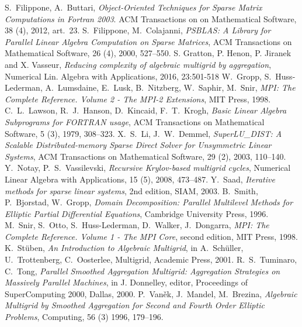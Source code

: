 \begin{thebibliography}{99}
%
S.~Filippone, A.~Buttari,
{\em Object-Oriented Techniques for Sparse Matrix Computations in Fortran 2003}.
ACM Transactions on on Mathematical Software, 38 (4), 2012, art.~23.
%
S.~Filippone, M.~Colajanni,
{\em PSBLAS: A Library for Parallel Linear Algebra
Computation on Sparse Matrices},
ACM Transactions on Mathematical Software, 26 (4), 2000, 527--550.
%
S. Gratton, P. Henon, P. Jiranek and X. Vasseur,
  {\em Reducing complexity of algebraic multigrid by aggregation},
Numerical Lin. Algebra with Applications, 2016, 23:501-518
%
W.~Gropp, S.~Huss-Lederman, A.~Lumsdaine, E.~Lusk, B.~Nitzberg, W.~Saphir, M.~Snir,
{\em MPI: The Complete Reference. Volume 2 - The MPI-2 Extensions},
MIT Press, 1998.
%
C.~L.~Lawson, R.~J.~Hanson, D.~Kincaid, F.~T.~Krogh,
\emph{Basic Linear Algebra Subprograms for FORTRAN usage},
ACM Transactions on Mathematical Software, 5 (3), 1979, 308--323.
%
X.~S.~Li, J.~W.~Demmel,
{\em SuperLU\_DIST: A Scalable Distributed-memory
Sparse Direct Solver for Unsymmetric Linear Systems},
ACM Transactions on Mathematical Software, 29 (2), 2003, 110--140.
%
Y.~Notay, P.~S.~Vassilevski,
{\em Recursive Krylov-based multigrid cycles},
Numerical Linear Algebra with Applications, 15 (5), 2008, 473--487.
%
Y.~Saad,
{\em Iterative methods for sparse linear systems}, 2nd edition, SIAM, 2003.
%
B.~Smith, P.~Bjorstad, W.~Gropp,
{\em Domain Decomposition: Parallel Multilevel Methods for Elliptic
Partial Differential Equations},
Cambridge University Press, 1996.
%
M.~Snir, S.~Otto, S.~Huss-Lederman, D.~Walker, J.~Dongarra,
{\em MPI: The Complete Reference. Volume 1 - The MPI Core}, second edition,
MIT Press, 1998.
%
K.~St\"{u}ben,
{\em An Introduction to Algebraic Multigrid},
in A.~Sch\"{u}ller, U.~Trottenberg, C.~Oosterlee, Multigrid,
Academic Press, 2001.
%
R.~S.~Tuminaro, C.~Tong,
{\em Parallel Smoothed Aggregation Multigrid: Aggregation Strategies on Massively Parallel Machines}, in J. Donnelley, editor, Proceedings of SuperComputing 2000, Dallas, 2000.
%
P.~Van\v{e}k, J.~Mandel, M.~Brezina,
{\em Algebraic Multigrid by Smoothed Aggregation for Second and Fourth Order Elliptic Problems},
Computing, 56 (3) 1996, 179--196.
%
\end{thebibliography}
